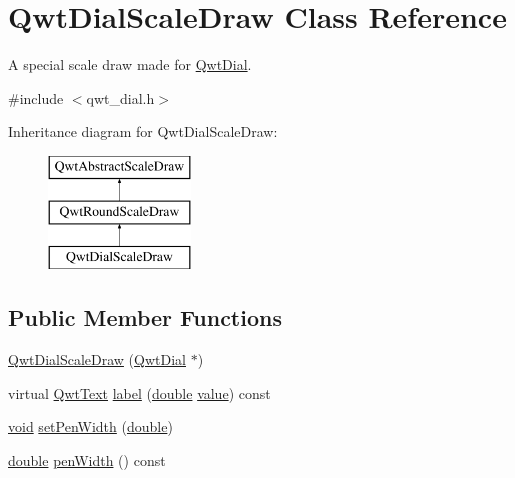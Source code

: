 \hypertarget{class_qwt_dial_scale_draw}{\section{Qwt\-Dial\-Scale\-Draw Class Reference}
\label{class_qwt_dial_scale_draw}
}


A special scale draw made for \hyperlink{class_qwt_dial}{Qwt\-Dial}.  




{\ttfamily \#include $<$qwt\-\_\-dial.\-h$>$}

Inheritance diagram for Qwt\-Dial\-Scale\-Draw\-:\begin{figure}[H]
\begin{center}
\leavevmode
\includegraphics[height=3.000000cm]{class_qwt_dial_scale_draw}
\end{center}
\end{figure}
\subsection*{Public Member Functions}
\begin{DoxyCompactItemize}
\item 
\hyperlink{class_qwt_dial_scale_draw_aa410c51b310d1492db2c0bbc0c1df163}{Qwt\-Dial\-Scale\-Draw} (\hyperlink{class_qwt_dial}{Qwt\-Dial} $\ast$)
\item 
virtual \hyperlink{class_qwt_text}{Qwt\-Text} \hyperlink{class_qwt_dial_scale_draw_aa497b0ca0f1c4d27a0bcc3c30556cb09}{label} (\hyperlink{_super_l_u_support_8h_a8956b2b9f49bf918deed98379d159ca7}{double} \hyperlink{glext_8h_aa0e2e9cea7f208d28acda0480144beb0}{value}) const 
\item 
\hyperlink{group___u_a_v_objects_plugin_ga444cf2ff3f0ecbe028adce838d373f5c}{void} \hyperlink{class_qwt_dial_scale_draw_a2fcfdac93eb80c92f6841b140654bb46}{set\-Pen\-Width} (\hyperlink{_super_l_u_support_8h_a8956b2b9f49bf918deed98379d159ca7}{double})
\item 
\hyperlink{_super_l_u_support_8h_a8956b2b9f49bf918deed98379d159ca7}{double} \hyperlink{class_qwt_dial_scale_draw_ada6f34e92c47bbe2916c50e67494a542}{pen\-Width} () const 
\end{DoxyCompactItemize}
